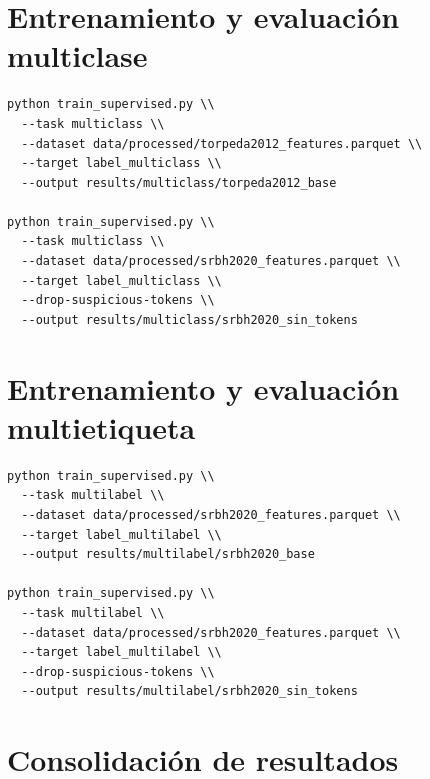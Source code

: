 \documentclass[12pt,oneside]{report}
\begin{document}
\section*{Entrenamiento y evaluación multiclase}

\begin{verbatim}
python train_supervised.py \\
  --task multiclass \\
  --dataset data/processed/torpeda2012_features.parquet \\
  --target label_multiclass \\
  --output results/multiclass/torpeda2012_base

python train_supervised.py \\
  --task multiclass \\
  --dataset data/processed/srbh2020_features.parquet \\
  --target label_multiclass \\
  --drop-suspicious-tokens \\
  --output results/multiclass/srbh2020_sin_tokens
\end{verbatim}

\section*{Entrenamiento y evaluación multietiqueta}

\begin{verbatim}
python train_supervised.py \\
  --task multilabel \\
  --dataset data/processed/srbh2020_features.parquet \\
  --target label_multilabel \\
  --output results/multilabel/srbh2020_base

python train_supervised.py \\
  --task multilabel \\
  --dataset data/processed/srbh2020_features.parquet \\
  --target label_multilabel \\
  --drop-suspicious-tokens \\
  --output results/multilabel/srbh2020_sin_tokens
\end{verbatim}

\section*{Consolidación de resultados}
\end{document}
